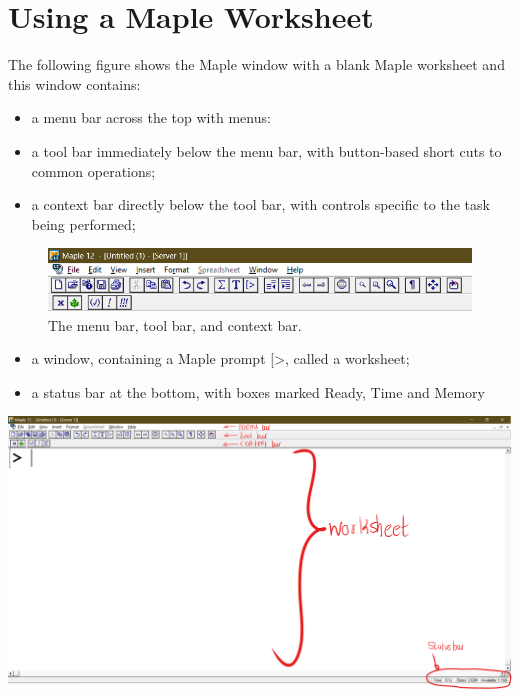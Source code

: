 \documentclass[
]{book}
\providecommand{\tightlist}{%
  \setlength{\itemsep}{0pt}\setlength{\parskip}{0pt}}
\theoremstyle{definition}
\theoremstyle{definition}
\theoremstyle{definition}
\theoremstyle{definition}
\theoremstyle{remark}
\begin{document}
\section{Using a Maple Worksheet}\label{using-a-maple-worksheet-1}

The following figure shows the Maple window with a blank Maple worksheet and this window contains:

\begin{itemize}
\tightlist
\item
  a menu bar across the top with menus:
\item
  a tool bar immediately below the menu bar, with button-based short cuts to common operations;
\item
  a context bar directly below the tool bar, with controls specific to the task being performed;
\end{itemize}

\begin{figure}
\centering
\includegraphics{figures/Lesson 1/fig1.png}
\caption{The menu bar, tool bar, and context bar.}
\end{figure}

\begin{itemize}
\tightlist
\item
  a window, containing a Maple prompt {[}\textgreater, called a worksheet;
\item
  a status bar at the bottom, with boxes marked Ready, Time and Memory
\end{itemize}

\includegraphics{figures/Lesson 1/fig2.png}
\end{document}
